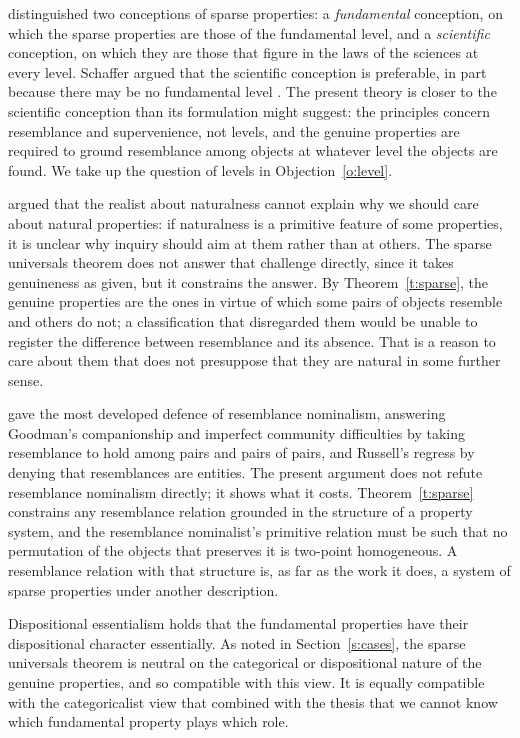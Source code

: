 \documentclass{situationist-preprint}
\begin{document}
\citet{Schaffer2004} distinguished two conceptions of sparse properties: a \emph{fundamental} conception, on which the sparse properties are those of the fundamental level, and a \emph{scientific} conception, on which they are those that figure in the laws of the sciences at every level. Schaffer argued that the scientific conception is preferable, in part because there may be no fundamental level \citep{Schaffer2003}. The present theory is closer to the scientific conception than its formulation might suggest: the principles concern resemblance and supervenience, not levels, and the genuine properties are required to ground resemblance among objects at whatever level the objects are found. We take up the question of levels in Objection~\ref{o:level}.

\citet{Dasgupta2018} argued that the realist about naturalness cannot explain why we should care about natural properties: if naturalness is a primitive feature of some properties, it is unclear why inquiry should aim at them rather than at others. The sparse universals theorem does not answer that challenge directly, since it takes genuineness as given, but it constrains the answer. By Theorem~\ref{t:sparse}, the genuine properties are the ones in virtue of which some pairs of objects resemble and others do not; a classification that disregarded them would be unable to register the difference between resemblance and its absence. That is a reason to care about them that does not presuppose that they are natural in some further sense.

\citet{RodriguezPereyra2002} gave the most developed defence of resemblance nominalism, answering Goodman's companionship and imperfect community difficulties by taking resemblance to hold among pairs and pairs of pairs, and Russell's regress by denying that resemblances are entities. The present argument does not refute resemblance nominalism directly; it shows what it costs. Theorem~\ref{t:sparse} constrains any resemblance relation grounded in the structure of a property system, and the resemblance nominalist's primitive relation must be such that no permutation of the objects that preserves it is two-point homogeneous. A resemblance relation with that structure is, as far as the work it does, a system of sparse properties under another description.

Dispositional essentialism \citep{Bird2007} holds that the fundamental properties have their dispositional character essentially. As noted in Section~\ref{s:cases}, the sparse universals theorem is neutral on the categorical or dispositional nature of the genuine properties, and so compatible with this view. It is equally compatible with the categoricalist view that \citet{Lewis2009} combined with the thesis that we cannot know which fundamental property plays which role.
\end{document}
